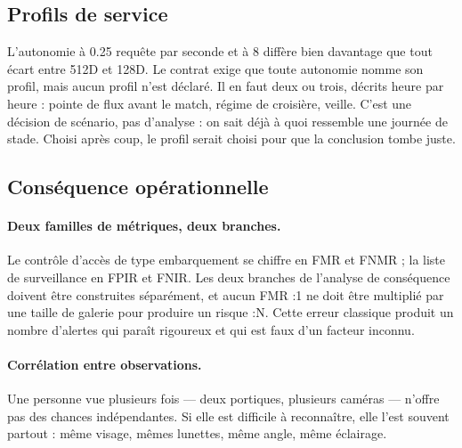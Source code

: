 \documentclass[11pt,a4paper]{article}
\newcommand{\unun}{{\NoAutoSpacing 1:1}}
\newcommand{\unN}{{\NoAutoSpacing 1:N}}
\begin{document}
\subsection{Profils de service}

L'autonomie à \num{0,25} requête par seconde et à 8 diffère bien davantage que tout
écart entre 512D et 128D. Le contrat exige que toute autonomie nomme son profil, mais
aucun profil n'est déclaré. Il en faut deux ou trois, décrits heure par heure : pointe
de flux avant le match, régime de croisière, veille. C'est une décision de scénario,
pas d'analyse : on sait déjà à quoi ressemble une journée de stade. Choisi après coup,
le profil serait choisi pour que la conclusion tombe juste.

\subsection{Conséquence opérationnelle}

\paragraph{Deux familles de métriques, deux branches.} Le contrôle d'accès de type
embarquement se chiffre en FMR et FNMR ; la liste de surveillance en FPIR et FNIR. Les
deux branches de l'analyse de conséquence doivent être construites séparément, et
aucun FMR \unun{} ne doit être multiplié par une taille de galerie pour produire un
risque \unN. Cette erreur classique produit un nombre d'alertes qui paraît rigoureux
et qui est faux d'un facteur inconnu.

\paragraph{Corrélation entre observations.} Une personne vue plusieurs fois — deux
portiques, plusieurs caméras — n'offre pas des chances indépendantes. Si elle est
difficile à reconnaître, elle l'est souvent partout : même visage, mêmes lunettes,
même angle, même éclairage.
\end{document}
